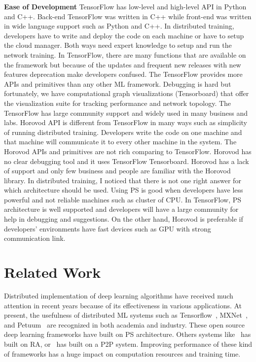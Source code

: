 \documentclass[conference]{IEEEtran}
\begin{document}
\fi
\textbf{Ease of Development} TensorFlow has low-level and high-level API in Python and C++. Back-end TensorFlow was written in C++ while front-end was written in wide language support such as Python and C++. In distributed training, developers have to write and deploy the code on each machine or have to setup the cloud manager. Both ways need expert knowledge to setup and run the network training. In TensorFlow, there are many functions that are available on the framework but because of the updates and frequent new releases with new features deprecation make developers confused. The TensorFlow provides more APIs and primitives than any other ML framework. Debugging is hard but fortunately, we have computational graph visualizations (Tensorboard) that offer the visualization suite for tracking performance and network topology. The TensorFlow has large community support and widely used in many business and labs. Horovod API is different from TensorFlow in many ways such as simplicity of running distributed training. Developers write the code on one machine and that machine will communicate it to every other machine in the system. The Horovod APIs and primitives are not rich comparing to TensorFlow. Horovod has no clear debugging tool and it uses TensorFlow Tensorboard. Horovod has a lack of support and only few business and people are familiar with the Horovod library. In distributed training, I noticed that there is not one right answer for which architecture should be used. Using PS is good when developers have less powerful and not reliable machines such as cluster of CPU. In TensorFlow, PS architecture is well supported and developers will have a large community for help in debugging and suggestions. On the other hand, Horovod is preferable if developers' environments have fast devices such as GPU with strong communication link. 


\section{Related Work}
\label{sec:rw}

Distributed implementation of deep learning algorithms have received much attention in recent years because of its effectiveness in various applications. At present, the usefulness of distributed ML systems such as Tensorflow~\cite{abadi2016tensorflow}, MXNet~\cite{chen2015mxnet}, and Petuum~\cite{xing2015petuum} are recognized in both academia and industry. These open source deep learning frameworks have built on PS architecture. Others systems like~\cite{sergeev2018horovod} has built on RA, or~\cite{li2015malt} has built on a P2P system. Improving performance of these kind of frameworks has a huge impact on computation resources and training time. 
\end{document}
